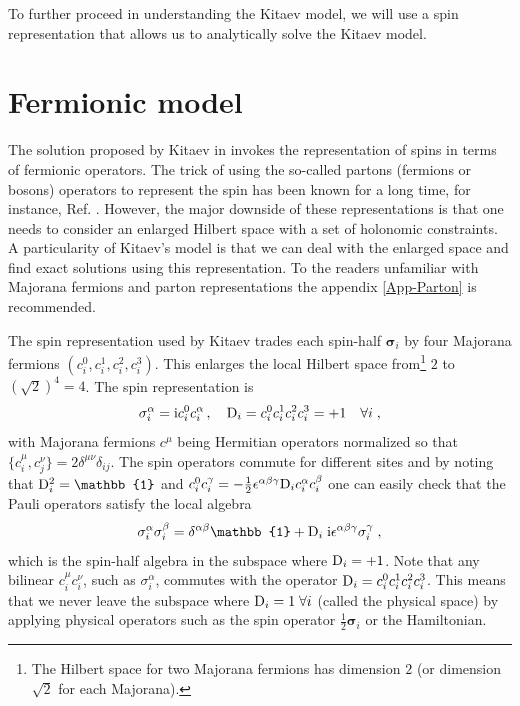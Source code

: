 To further proceed in understanding the Kitaev model, we will use a spin representation that allows us to analytically solve the Kitaev model.









\section{Fermionic model}

The solution proposed by Kitaev in \cite{Kitaev2006} invokes the representation of spins in terms of fermionic operators.
The trick of using the so-called partons (fermions or bosons) operators to represent the spin has been known for a long time, for instance, Ref. \cite{Abrikosov1965, Baskaran_1987}.
However, the major downside of these representations is that one needs to consider an enlarged Hilbert space with a set of holonomic constraints.
A particularity of Kitaev's model is that we can deal with the enlarged space and find exact solutions using this representation.
To the readers unfamiliar with Majorana fermions and parton representations the appendix \ref{App-Parton} is recommended.

The spin representation used by Kitaev trades each spin-half $\bm{\sigma}_i$ by four Majorana fermions $(c^0_i,c^1_i,c^2_i,c^3_i)$.
This enlarges the local Hilbert space from\footnote{The Hilbert space for two Majorana fermions has dimension $2$ (or dimension $\sqrt{2}$ for each Majorana).} $2$ to $(\sqrt{2})^4=4$.
The spin representation is
\begin{equation}
 \sigma_i^\alpha = \mathrm{i} c^0_i c^\alpha_i\, , \quad \mathrm{D}_i = c^0_ic^1_ic^2_ic^3_i=+1 \quad \forall i \; ,
\end{equation}
with Majorana fermions $c^\mu$ being Hermitian operators normalized so that $\{c^\mu_i,c^\nu_j\} = 2 \delta^{\mu\nu} \delta_{ij}$.
The spin operators commute for different sites and by noting that $\rmD_i^2=\mathbb{1}$ and
$  c^0_i c^\gamma_i = -\frac{1}{2} \epsilon^{\alpha\beta\gamma} \mathrm{D}_i  c^\alpha_i c^\beta_i $
one can easily check that the Pauli operators
 satisfy the local algebra
\begin{equation}
    \sigma_i^\alpha \sigma_i^\beta  = \delta^{\alpha\beta} \mathbb{1}   +  \rmD_i \; \im \epsilon^{\alpha\beta\gamma} \sigma_i^\gamma \; ,
\end{equation}
which is the spin-half algebra in the subspace where $\mathrm{D}_i=+1$. Note that any bilinear $c_i^\mu c_i^\nu$, such as $\sigma_i^\alpha$, commutes with the operator $\mathrm{D}_i  = c^0_ic^1_ic^2_ic^3_i $. This means that we never leave the subspace where $\mathrm{D}_i=1 \; \forall i$ (called the physical space) by applying physical operators such as the spin operator $\frac{1}{2}\bm{\sigma}_i$ or the Hamiltonian.


